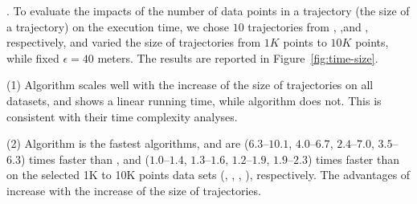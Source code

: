 .
To evaluate the impacts of the number of data points in a trajectory (\ie the size of a trajectory) on the execution time,
we chose {$10$} trajectories from \truck, \sercar,\geolife and \pricar, respectively,
and varied the size  of trajectories from $1K$ points to $10K$ points, while fixed $\epsilon = 40$ meters.
The results are reported in Figure~\ref{fig:time-size}.

\sstab(1) Algorithm \cist scales well with the increase of the size of trajectories on all datasets,
and shows a linear running time, while algorithm \dpa does not.
This is consistent with their time complexity analyses.

\sstab(2) Algorithm \cist is the fastest \lsa algorithms, and are {($6.3$--$10.1$, $4.0$--$6.7$, $2.4$--$7.0$, $3.5$--$6.3$)} times faster than \dpa,
and {($1.0$--$1.4$, $1.3$--$1.6$, $1.2$--$1.9$, $1.9$--$2.3$)} times faster than \squishe on the selected 1K to 10K points data sets (\truck, \sercar, \geolife, \pricar), respectively.
The advantages of \cist increase with the increase of the size of trajectories.






